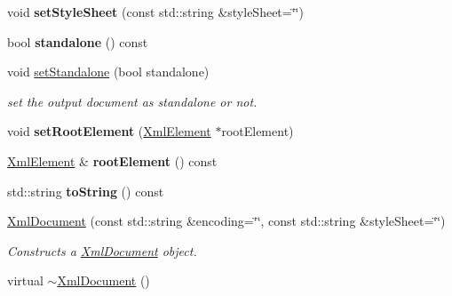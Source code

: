 \begin{DoxyCompactItemize}
\item 
\hypertarget{class_xml_document_a63cfdd276a9812900cd7739758effd78}{void {\bfseries set\+Style\+Sheet} (const std\+::string \&style\+Sheet=\char`\"{}\char`\"{})}\label{class_xml_document_a63cfdd276a9812900cd7739758effd78}

\item 
\hypertarget{class_xml_document_ab3ff5eb5c5df20453b4fc6f5b9bcff6e}{bool {\bfseries standalone} () const }\label{class_xml_document_ab3ff5eb5c5df20453b4fc6f5b9bcff6e}

\item 
void \hyperlink{class_xml_document_a3cc9d3452daba0bda758ee7add075827}{set\+Standalone} (bool standalone)
\begin{DoxyCompactList}\small\item\em set the output document as standalone or not. \end{DoxyCompactList}\item 
\hypertarget{class_xml_document_a2b419770905e48914ed6dba3990061cd}{void {\bfseries set\+Root\+Element} (\hyperlink{class_xml_element}{Xml\+Element} $\ast$root\+Element)}\label{class_xml_document_a2b419770905e48914ed6dba3990061cd}

\item 
\hypertarget{class_xml_document_a23a48b334d0ab31d4d68a489d0c60acc}{\hyperlink{class_xml_element}{Xml\+Element} \& {\bfseries root\+Element} () const }\label{class_xml_document_a23a48b334d0ab31d4d68a489d0c60acc}

\item 
\hypertarget{class_xml_document_aa75e20c19ee0719af2e5b573db02f5a4}{std\+::string {\bfseries to\+String} () const }\label{class_xml_document_aa75e20c19ee0719af2e5b573db02f5a4}

\item 
\hyperlink{class_xml_document_a3bc4c5ea5f22b4ff8776422125b31d42}{Xml\+Document} (const std\+::string \&encoding=\char`\"{}\char`\"{}, const std\+::string \&style\+Sheet=\char`\"{}\char`\"{})
\begin{DoxyCompactList}\small\item\em Constructs a \hyperlink{class_xml_document}{Xml\+Document} object. \end{DoxyCompactList}\item 
\hypertarget{class_xml_document_a5c95c959091f1ae826b8698ba0c3416c}{virtual \hyperlink{class_xml_document_a5c95c959091f1ae826b8698ba0c3416c}{$\sim$\+Xml\+Document} ()}\label{class_xml_document_a5c95c959091f1ae826b8698ba0c3416c}


\end{DoxyCompactItemize}
